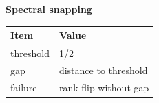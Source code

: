 \begin{center}
\textbf{Spectral snapping}\par\smallskip
\begin{tabular}{ll}
\toprule
Item & Value \\
\midrule
threshold & 1/2 \\
gap & distance to threshold \\
failure & rank flip without gap \\
\bottomrule
\end{tabular}
\end{center}
